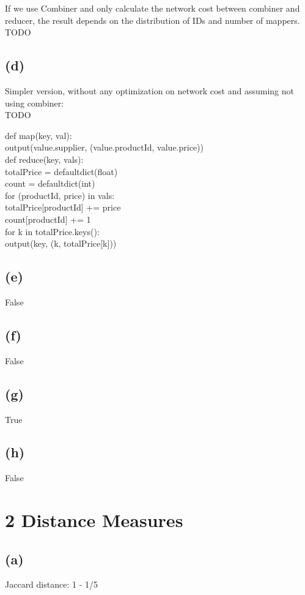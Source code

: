 \documentclass{article}
\begin{document}
If we use Combiner and only calculate the network cost between combiner and reducer, the result depends on the distribution of IDs and number of mappers. \\
TODO

\subsection{(d)}
Simpler version, without any optimization on network cost and assuming not using combiner: \\
TODO

def map(key, val): \\
\indent output(value.supplier, (value.productId, value.price)) \\
def reduce(key, vals): \\
\indent totalPrice = defaultdict(float) \\
\indent count = defaultdict(int) \\
\indent for (productId, price) in vals: \\
\indent \indent totalPrice[productId] += price \\
\indent \indent count[productId] += 1 \\
\indent for k in totalPrice.keys(): \\
\indent \indent output(key, (k, totalPrice[k]))

\subsection{(e)}
False

\subsection{(f)}
False

\subsection{(g)}
True

\subsection{(h)}
False




\section{2 Distance Measures}
\subsection{(a)}
Jaccard distance: 1 - 1/5
\end{document}
